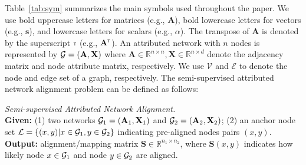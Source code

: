 Table~\ref{tab:sym} summarizes the main symbols used throughout the paper. We use bold uppercase letters for matrices (e.g., $\mathbf{A}$), bold lowercase letters for vectors (e.g., $\mathbf{s}$), and lowercase letters for scalars (e.g., $\alpha$).
The transpose of $\mathbf{A}$ is denoted by the superscript ${\scriptscriptstyle\mathsf{T}}$ (e.g., $\mathbf{A}^{\scriptscriptstyle\mathsf{T}}$).
An attributed network with $n$ nodes is represented by $\mathcal{G}=(\mathbf{A},\mathbf{X})$ where $\mathbf{A}\in\mathbb{R}^{n\times n},\mathbf{X}\in\mathbb{R}^{n\times d}$ denote the adjacency matrix and node attribute matrix, respectively. We use $\mathcal{V}$ and $\mathcal{E}$ to denote the node and edge set of a graph, respectively. The semi-supervised attributed network alignment problem can be defined as follows:
\begin{definition}
\textit{Semi-supervised Attributed Network Alignment.}\\
\textbf{Given:} (1) two networks $\mathcal{G}_1=(\mathbf{A}_1,\mathbf{X}_1)$ and $\mathcal{G}_2=(\mathbf{A}_2,\mathbf{X}_2)$; (2) an anchor node set $\mathcal{L}=\{(x,y)|x\in\mathcal{G}_1,y\in\mathcal{G}_2\}$ indicating pre-aligned nodes pairs $(x,y)$.\\
\textbf{Output:} alignment/mapping matrix $\mathbf{S}\in\mathbb{R}^{n_1\times n_2}$, where $\mathbf{S}(x,y)$ indicates how likely node $x\in\mathcal{G}_1$ and node $y\in\mathcal{G}_2$ are aligned.
\end{definition}

